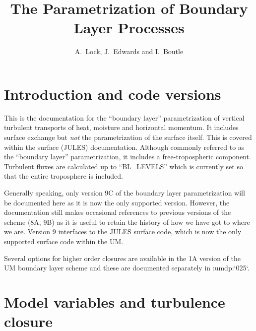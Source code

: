 \documentclass{UMDP_article}
\title{The Parametrization of Boundary Layer Processes}
\author{A.~Lock, J.~Edwards and I.~Boutle}
\newcommand{\citeumdp}[1]{:umdp:`#1`}
\begin{document}
 
\maketitle

\tableofcontents

\newpage

\section{Introduction and code versions}

This is the documentation for the ``boundary layer'' parametrization
of vertical turbulent transports of heat, moisture and horizontal
momentum.  It includes surface exchange but \emph{not} the
parametrization of the surface itself.  This is covered within the
surface (JULES) documentation.  Although commonly referred to as the
``boundary layer'' parametrization, it includes a free-tropospheric
component.  Turbulent fluxes are calculated up to ``BL\_LEVELS'' which
is currently set so that the entire troposphere is included.

Generally speaking, only version 9C of the boundary layer
parametrization will be documented here as it is now the only
supported version. However, the documentation still makes occasional
references to previous versions of the scheme (8A, 9B) as it is useful
to retain the history of how we have got to where we are. Version 9
interfaces to the JULES surface code, which is now the only supported
surface code within the UM.

Several options for higher order closures are available in the 1A
version of the UM boundary layer scheme and these are documented
separately in \citeumdp{025}.

\section{Model variables and turbulence closure}
\label{sec:closure}
\end{document}
